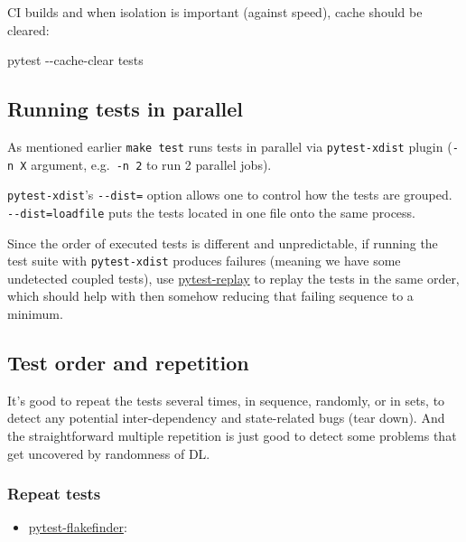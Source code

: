 \documentclass[
]{report}
\newenvironment{Shaded}{\begin{snugshade}}{\end{snugshade}}
\newcommand{\AttributeTok}[1]{\textcolor[rgb]{0.40,0.45,0.13}{#1}}
\newcommand{\ExtensionTok}[1]{\textcolor[rgb]{0.00,0.23,0.31}{#1}}
\newcommand{\NormalTok}[1]{\textcolor[rgb]{0.00,0.23,0.31}{#1}}
\providecommand{\tightlist}{%
  \setlength{\itemsep}{0pt}\setlength{\parskip}{0pt}}\usepackage{longtable,booktabs,array}
\begin{document}
CI builds and when isolation is important (against speed), cache should
be cleared:

\begin{Shaded}
\begin{Highlighting}[]
\ExtensionTok{pytest} \AttributeTok{{-}{-}cache{-}clear}\NormalTok{ tests}
\end{Highlighting}
\end{Shaded}

\subsection{Running tests in parallel}\label{running-tests-in-parallel}

As mentioned earlier \texttt{make\ test} runs tests in parallel via
\texttt{pytest-xdist} plugin (\texttt{-n\ X} argument,
e.g.~\texttt{-n\ 2} to run 2 parallel jobs).

\texttt{pytest-xdist}'s \texttt{-\/-dist=} option allows one to control
how the tests are grouped. \texttt{-\/-dist=loadfile} puts the tests
located in one file onto the same process.

Since the order of executed tests is different and unpredictable, if
running the test suite with \texttt{pytest-xdist} produces failures
(meaning we have some undetected coupled tests), use
\href{https://github.com/ESSS/pytest-replay}{pytest-replay} to replay
the tests in the same order, which should help with then somehow
reducing that failing sequence to a minimum.

\subsection{Test order and repetition}\label{test-order-and-repetition}

It's good to repeat the tests several times, in sequence, randomly, or
in sets, to detect any potential inter-dependency and state-related bugs
(tear down). And the straightforward multiple repetition is just good to
detect some problems that get uncovered by randomness of DL.

\subsubsection{Repeat tests}\label{repeat-tests}

\begin{itemize}
\tightlist
\item
  \href{https://github.com/dropbox/pytest-flakefinder}{pytest-flakefinder}:
\end{itemize}
\end{document}

